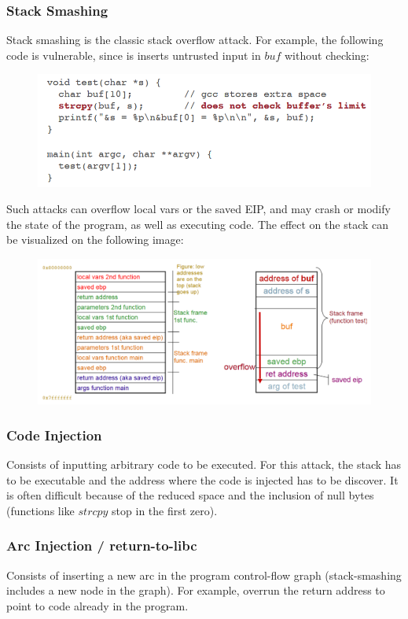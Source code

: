 \documentclass[10pt,a4paper]{report}
\begin{document}
\subsubsection{Stack Smashing}
Stack smashing is the classic stack overflow attack. For example, the following code is vulnerable, since is inserts untrusted input in $buf$ without checking:
\begin{figure}[H]
\centering
\includegraphics[scale=0.4]{13.png}
\end{figure}
Such attacks can overflow local vars or the saved EIP, and may crash or modify the state of the program, as well as executing code. The effect on the stack can be visualized on the following image:
\begin{figure}[H]
\centering
\includegraphics[scale=0.4]{14.png}
\end{figure}
\subsubsection{Code Injection}
Consists of inputting arbitrary code to be executed. For this attack, the stack has to be executable and the address where the code is injected has to be discover. It is often difficult because of the reduced space and the inclusion of null bytes (functions like $strcpy$ stop in the first zero).
\subsubsection{Arc Injection / return-to-libc}
Consists of inserting a new arc in the program control-flow graph (stack-smashing includes a new node in the graph). For example, overrun the return address to point to code already in the program.
\end{document}
